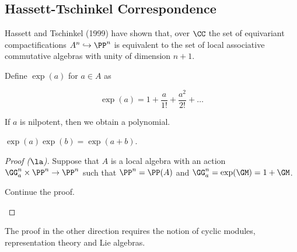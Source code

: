\documentclass[11pt]{scrartcl}
\begin{document}
  \subsection{Hassett-Tschinkel Correspondence}

  Hassett and Tschinkel (1999) have shown that, over $\CC$ the set of
  equivariant compactifications $A^{n} \hookrightarrow \PP^{n}$ is
  equivalent to the set of local associative commutative algebras with
  unity of dimension $n+1$.

  Define $\exp(a)$ for $a\in A$ as
  
  \begin{equation*}
    \exp(a) = 1 + \frac{a}{1!} + \frac{a^{2}}{2!} + \dots
  \end{equation*}

  If $a$ is nilpotent, then we obtain a polynomial.

  \begin{exercise}

    $\exp(a)\exp(b) = \exp(a+b)$.

  \end{exercise}

  \begin{proof}[Proof ($\la$)]
    \hfill

    Suppose that $A$ is a local algebra with an action
    $\GG_{a}^{n}\times \PP^{n} \to \PP^{n}$ such that
    $\PP^{n} = \PP(A)$ and $\GG_{a}^{n} = \exp(\GM) = 1+\GM$.

    \begin{exercise}

      Continue the proof.

    \end{exercise}
  \end{proof}

  The proof in the other direction requires the notion of cyclic
  modules, representation theory and Lie algebras.




    
    

  

  
\end{document}
